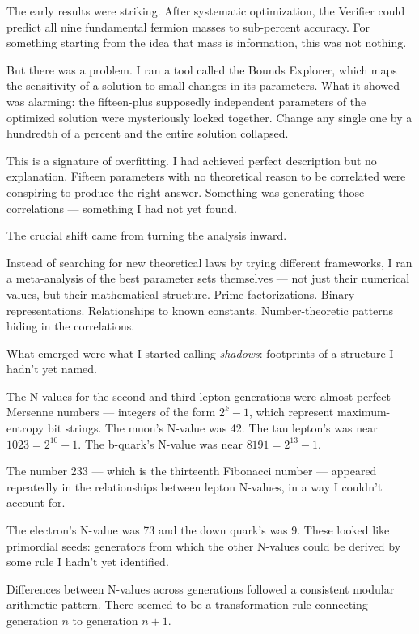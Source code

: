 \documentclass[11pt,openany]{book}
\theoremstyle{remark}
\begin{document}
The early results were striking.
After systematic optimization, the Verifier could predict all nine fundamental fermion
masses to sub-percent accuracy.
For something starting from the idea that mass is information, this was not nothing.

But there was a problem.
I ran a tool called the Bounds Explorer, which maps the sensitivity of a solution to
small changes in its parameters.
What it showed was alarming: the fifteen-plus supposedly independent parameters of the
optimized solution were mysteriously locked together.
Change any single one by a hundredth of a percent and the entire solution collapsed.

This is a signature of overfitting.
I had achieved perfect description but no explanation.
Fifteen parameters with no theoretical reason to be correlated were conspiring to produce
the right answer.
Something was generating those correlations --- something I had not yet found.

\medskip

The crucial shift came from turning the analysis inward.

Instead of searching for new theoretical laws by trying different frameworks, I ran a
meta-analysis of the best parameter sets themselves --- not just their numerical values,
but their mathematical structure.
Prime factorizations. Binary representations. Relationships to known constants.
Number-theoretic patterns hiding in the correlations.

What emerged were what I started calling \emph{shadows}: footprints of a structure I
hadn't yet named.

The N-values for the second and third lepton generations were almost perfect Mersenne
numbers --- integers of the form $2^k - 1$, which represent maximum-entropy bit strings.
The muon's N-value was 42.
The tau lepton's was near $1023 = 2^{10} - 1$.
The b-quark's N-value was near $8191 = 2^{13} - 1$.

The number 233 --- which is the thirteenth Fibonacci number --- appeared repeatedly in
the relationships between lepton N-values, in a way I couldn't account for.

The electron's N-value was 73 and the down quark's was 9.
These looked like primordial seeds: generators from which the other N-values could be
derived by some rule I hadn't yet identified.

Differences between N-values across generations followed a consistent modular arithmetic
pattern.
There seemed to be a transformation rule connecting generation $n$ to generation $n+1$.
\end{document}
